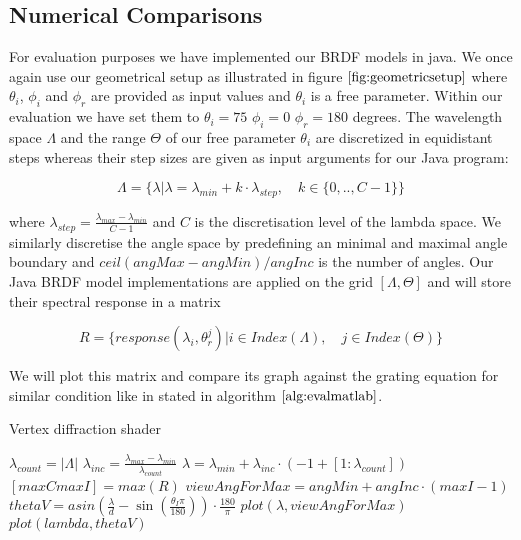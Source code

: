 \subsection{Numerical Comparisons}
\label{sec:evalprecomp}
For evaluation purposes we have implemented our BRDF models in java. We once again use our geometrical setup as illustrated in figure $\ref{fig:geometricsetup}$ where $\theta_i$, $\phi_i$ and $\phi_r$ are provided as input values and $\theta_i$ is a free parameter. Within our evaluation we have set them to $\theta_i = 75$ $\phi_i = 0$ $\phi_r = 180$ degrees. The wavelength space $\Lambda$ and the range $\Theta$ of our free parameter $\theta_i$ are discretized in equidistant steps whereas their step sizes are given as input arguments for our Java program:

\begin{equation}
\Lambda = \{\lambda | \lambda = \lambda_{min} + k \cdot \lambda_{step}, \quad k \in \{0,..,C-1\}\}
\label{eq:lambdaspacesetup}
\end{equation}

where $\lambda_{step} = \frac{\lambda_{max}-\lambda_{min}}{C-1}$ and $C$ is the discretisation level of the lambda space. We similarly discretise the angle space by predefining an minimal and maximal angle boundary and $ceil(angMax - angMin) / angInc$ is the number of angles. Our Java BRDF model implementations are applied on the grid $[\Lambda, \Theta]$ and will store their spectral response in a matrix

\begin{equation} 
R = \{response(\lambda_i, \theta_{r}^{j}) | i \in Index(\Lambda), \quad j \in Index(\Theta)\}
\label{eq:responsematrix}
\end{equation}

We will plot this matrix and compare its graph against the grating equation for similar condition like in stated in algorithm $\ref{alg:evalmatlab}$.

\begin{algorithm}[H]
  \caption{Vertex diffraction shader}
  \begin{algorithmic}
    \State $ \lambda_{count} = |\Lambda| $
    \State $ \lambda_{inc} = \frac{\lambda_{max}-\lambda_{min}}{\lambda_{count}}$
    \State $ \lambda = \lambda_{min} + \lambda_{inc} \cdot (-1+[1:\lambda_{count}])$
    \State $ [maxC maxI] = max(R)$
    \State $ viewAngForMax = angMin + angInc \cdot (maxI-1)$
    \State $ thetaV = asin \left( \frac{\lambda}{d} - \sin \left(  \frac{\theta_I \pi}{180} \right) \right) \cdot \frac{180}{\pi}$
    \State $ plot(\lambda, viewAngForMax)$
    \State $ plot(lambda, thetaV)$
  \end{algorithmic}
\label{alg:evalmatlab}
\end{algorithm}

